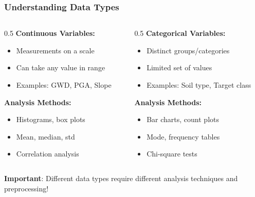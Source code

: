 \documentclass[aspectratio=169]{beamer}
\begin{document}
\begin{frame}
\frametitle{Understanding Data Types}

\begin{columns}[T]
    \begin{column}{0.5\textwidth}
        \textbf{Continuous Variables:}
        \begin{itemize}
            \item Measurements on a scale
            \item Can take any value in range
            \item Examples: GWD, PGA, Slope
        \end{itemize}

        \textbf{Analysis Methods:}
        \begin{itemize}
            \item Histograms, box plots
            \item Mean, median, std
            \item Correlation analysis
        \end{itemize}
    \end{column}
    \begin{column}{0.5\textwidth}
        \textbf{Categorical Variables:}
        \begin{itemize}
            \item Distinct groups/categories
            \item Limited set of values
            \item Examples: Soil type, Target class
        \end{itemize}

        \textbf{Analysis Methods:}
        \begin{itemize}
            \item Bar charts, count plots
            \item Mode, frequency tables
            \item Chi-square tests
        \end{itemize}
    \end{column}
\end{columns}

\vspace{0.5cm}

\textbf{Important}: Different data types require different analysis techniques and preprocessing!

\end{frame}
\end{document}
